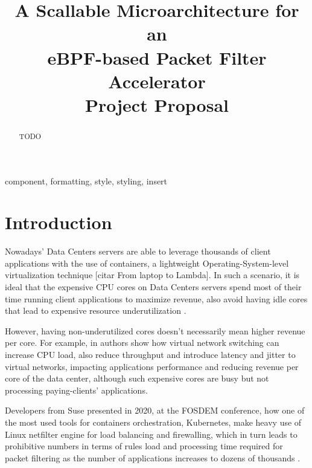 \documentclass[conference]{IEEEtran}
\begin{document}
\title{A Scallable Microarchitecture for an \\ eBPF-based Packet Filter Accelerator\\
{\large Project Proposal}
}

\author{
}

\maketitle

\begin{abstract}
TODO
\end{abstract}

\begin{IEEEkeywords}
component, formatting, style, styling, insert
\end{IEEEkeywords}

\section{Introduction}
Nowadays' Data Centers servers are able to leverage thousands of client applications with the use of containers, a lightweight Operating-System-level virtualization technique [citar From laptop to Lambda]. In such a scenario, it is ideal that the expensive CPU cores on Data Centers servers spend most of their time running client applications to maximize revenue, also avoid having idle cores that lead to expensive resource underutilization \cite{li:2020:dccpi}. 

However, having non-underutilized cores doesn't necessarily mean higher revenue per core. For example, in \cite{emmerich:2018:ovs-throughput} authors show how virtual network switching can increase CPU load, also reduce throughput and introduce latency and jitter to virtual networks, impacting applications performance and reducing revenue per core of the data center, although such expensive cores are busy but not processing paying-clients' applications.

Developers from Suse presented in 2020, at the FOSDEM conference, how one of the most used tools for containers orchestration, Kubernetes, make heavy use of Linux netfilter engine for load balancing and firewalling, which in turn leads to prohibitive numbers in terms of rules load and processing time required for packet filtering as the number of applications increases to dozens of thousands \cite{restecki:2020:iptables-ebpf}.
\end{document}
